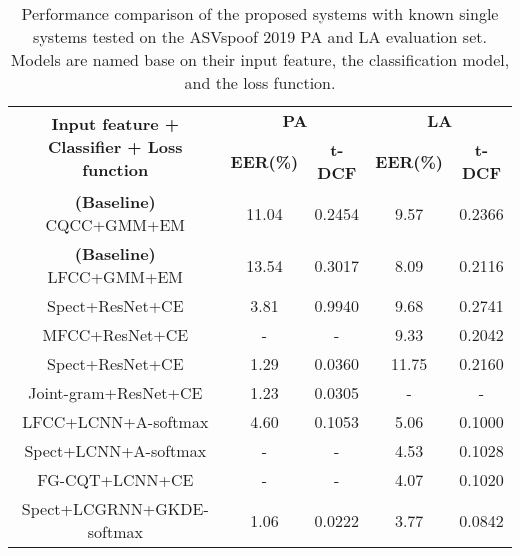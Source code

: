 \documentclass[a4paper]{article}
\begin{document}
\begin{table*}[t]
\caption{Performance comparison of the proposed systems with known single systems tested on the ASVspoof  2019 PA and LA evaluation set. Models are named base on their input feature, the classification model, and the loss function.}
\centering
\begin{tabular}{|c|c|c|c|c|}
\hline
\multirow{2}{*}{\textbf{Input feature + Classifier + Loss function}} &
  \multicolumn{2}{c|}{\textbf{PA}} &
  \multicolumn{2}{c|}{\textbf{LA}} \\ \cline{2-5} 
 &
  \multicolumn{1}{c|}{\textbf{EER(\%)}} &
  \multicolumn{1}{c|}{\textbf{t-DCF}} &
  \multicolumn{1}{c|}{\textbf{EER(\%)}} &
  \multicolumn{1}{c|}{\textbf{t-DCF}} \\ \hline
\multicolumn{1}{|c|}{\textbf{(Baseline)} CQCC+GMM+EM \cite{9todisco2019asvspoof}} & 11.04          & 0.2454 & 9.57          & 0.2366 \\ \hline
\multicolumn{1}{|c|}{\textbf{(Baseline)} LFCC+GMM+EM \cite{9todisco2019asvspoof}} & 13.54          & 0.3017 & 8.09          & 0.2116   \\ \hline
Spect+ResNet+CE \cite{28alzantot2019deep}
& 3.81          & 0.9940& 9.68         & 0.2741 \\ \hline
MFCC+ResNet+CE \cite{28alzantot2019deep}                                                   & -          & - & 9.33         & 0.2042   \\ \hline
Spect+ResNet+CE \cite{18lai2019assert}                                                     & 1.29          & 0.0360 & 11.75          & 0.2160 \\ \hline
Joint-gram+ResNet+CE \cite{10cai2019dku}                                                     & 1.23          & 0.0305 & -          & -  \\ \hline
LFCC+LCNN+A-softmax \cite{30lavrentyeva2019stc}                                                     & 4.60          & 0.1053 & 5.06          & 0.1000 \\ \hline
Spect+LCNN+A-softmax \cite{30lavrentyeva2019stc}                                                     & -         & - & 4.53          & 0.1028   \\ \hline
FG-CQT+LCNN+CE \cite{31wu2020light}                                                     & -          & - & 4.07          & 0.1020 \\ \hline
Spect+LCGRNN+GKDE-softmax \cite{32gomez2020kernel}                                                     & 1.06          & 0.0222 & 3.77          & 0.0842   \\ \hline

\end{tabular}
\end{table*}
\end{document}
